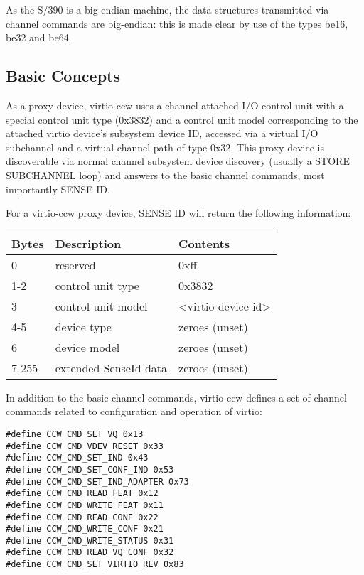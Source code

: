 As the S/390 is a big endian machine, the data structures transmitted
via channel commands are big-endian: this is made clear by use of
the types be16, be32 and be64.

\subsection{Basic Concepts}\label{sec:Virtio Transport Options / Virtio over channel I/O / Basic Concepts}

As a proxy device, virtio-ccw uses a channel-attached I/O control
unit with a special control unit type (0x3832) and a control unit
model corresponding to the attached virtio device's subsystem
device ID, accessed via a virtual I/O subchannel and a virtual
channel path of type 0x32. This proxy device is discoverable via
normal channel subsystem device discovery (usually a STORE
SUBCHANNEL loop) and answers to the basic channel commands, most
importantly SENSE ID.

For a virtio-ccw proxy device, SENSE ID will return the following
information:

\begin{tabular}{ |l|l|l| }
\hline
Bytes & Description & Contents \\
\hline \hline
0     & reserved              & 0xff \\
\hline
1-2   & control unit type     & 0x3832 \\
\hline
3     & control unit model    & <virtio device id> \\
\hline
4-5   & device type           & zeroes (unset) \\
\hline
6     & device model          & zeroes (unset) \\
\hline
7-255 & extended SenseId data & zeroes (unset) \\
\hline
\end{tabular}

In addition to the basic channel commands, virtio-ccw defines a
set of channel commands related to configuration and operation of
virtio:

\begin{lstlisting}
#define CCW_CMD_SET_VQ 0x13
#define CCW_CMD_VDEV_RESET 0x33
#define CCW_CMD_SET_IND 0x43
#define CCW_CMD_SET_CONF_IND 0x53
#define CCW_CMD_SET_IND_ADAPTER 0x73
#define CCW_CMD_READ_FEAT 0x12
#define CCW_CMD_WRITE_FEAT 0x11
#define CCW_CMD_READ_CONF 0x22
#define CCW_CMD_WRITE_CONF 0x21
#define CCW_CMD_WRITE_STATUS 0x31
#define CCW_CMD_READ_VQ_CONF 0x32
#define CCW_CMD_SET_VIRTIO_REV 0x83
\end{lstlisting}

